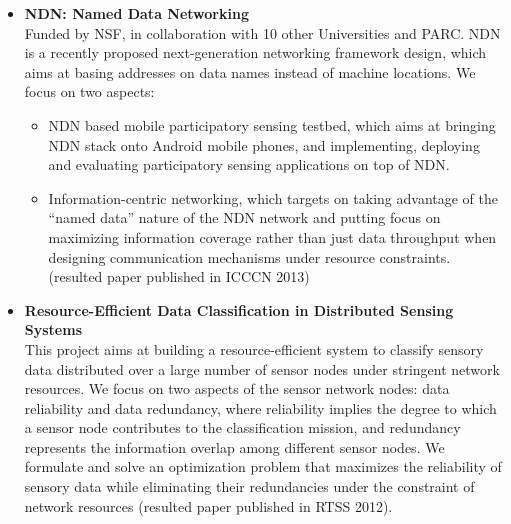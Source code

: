 \begin{itemize}
\item \textbf{NDN: Named Data Networking} \\ Funded by NSF, in
  collaboration with 10 other Universities and PARC. NDN is a recently
  proposed next-generation networking framework design, which aims at
  basing addresses on data names instead of machine locations. We
  focus on two aspects:
\begin{itemize}
\item NDN based mobile participatory sensing testbed, which aims at
  bringing NDN stack onto Android mobile phones, and implementing,
  deploying and evaluating participatory sensing applications on top
  of NDN.
\item Information-centric networking, which targets on taking
  advantage of the ``named data'' nature of the NDN network and
  putting focus on maximizing information coverage rather than just
  data throughput when designing communication mechanisms under
  resource constraints. (resulted paper published in \textsc{ICCCN
    2013})
\end{itemize}

\item \textbf{Resource-Efficient Data Classification in Distributed
  Sensing Systems} \\ This project aims at building a
  resource-efficient system to classify sensory data distributed over
  a large number of sensor nodes under stringent network resources.
  We focus on two aspects of the sensor network nodes: data
  reliability and data redundancy, where reliability implies the
  degree to which a sensor node contributes to the classification
  mission, and redundancy represents the information overlap among
  different sensor nodes. We formulate and solve an optimization
  problem that maximizes the reliability of sensory data while
  eliminating their redundancies under the constraint of network
  resources (resulted paper published in \textsc{RTSS 2012}).

\end{itemize}

